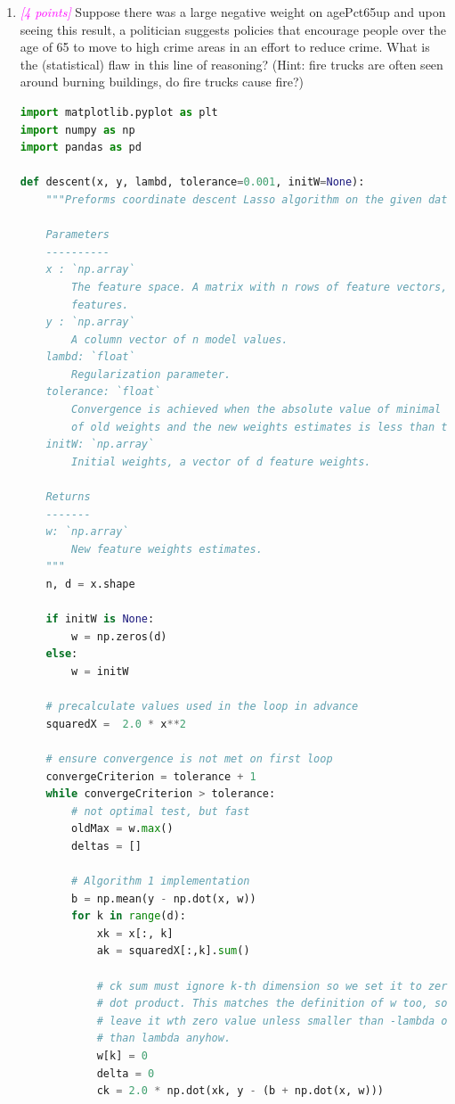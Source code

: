 \documentclass{article}
\newcommand{\1}{\mathbf{1}}
\newcommand{\points}[1]{\small\textcolor{magenta}{\emph{[#1 points]}} \normalsize}
\begin{document}
\begin{enumerate}
    

    
    \item \points{4} Suppose there was a large negative weight on agePct65up and upon seeing this result, a politician suggests policies that encourage people over the age of 65 to move to high crime areas in an effort to reduce crime. What is the (statistical) flaw in this line of reasoning? (Hint:  fire trucks are often seen around burning buildings, do fire trucks cause fire?)
    
    
    
\begin{lstlisting}[language=Python]
import matplotlib.pyplot as plt
import numpy as np
import pandas as pd

def descent(x, y, lambd, tolerance=0.001, initW=None):
    """Preforms coordinate descent Lasso algorithm on the given data.

    Parameters
    ----------
    x : `np.array`
        The feature space. A matrix with n rows of feature vectors, each with d
        features.
    y : `np.array`
        A column vector of n model values.
    lambd: `float`
        Regularization parameter.
    tolerance: `float`
        Convergence is achieved when the absolute value of minimal difference
        of old weights and the new weights estimates is less than tolerance.
    initW: `np.array`
        Initial weights, a vector of d feature weights.

    Returns
    -------
    w: `np.array`
        New feature weights estimates. 
    """
    n, d = x.shape

    if initW is None:
        w = np.zeros(d)
    else:
        w = initW

    # precalculate values used in the loop in advance
    squaredX =  2.0 * x**2

    # ensure convergence is not met on first loop
    convergeCriterion = tolerance + 1
    while convergeCriterion > tolerance:
        # not optimal test, but fast
        oldMax = w.max()
        deltas = []

        # Algorithm 1 implementation
        b = np.mean(y - np.dot(x, w))
        for k in range(d):
            xk = x[:, k]
            ak = squaredX[:,k].sum()

            # ck sum must ignore k-th dimension so we set it to zero and use
            # dot product. This matches the definition of w too, so we can
            # leave it wth zero value unless smaller than -lambda or bigger
            # than lambda anyhow. 
            w[k] = 0
            delta = 0
            ck = 2.0 * np.dot(xk, y - (b + np.dot(x, w)))


\end{lstlisting}
\end{enumerate}
\end{document}
